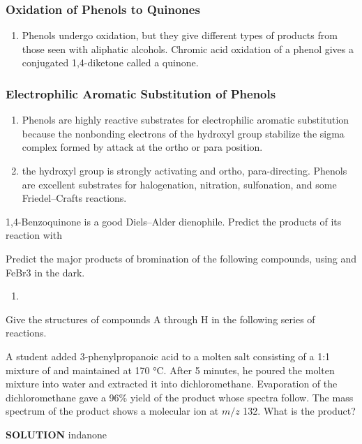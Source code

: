 \subsubsection{Oxidation of Phenols to Quinones}

\begin{enumerate}
    \item Phenols undergo oxidation, but they give different types of products from those seen with aliphatic alcohols. Chromic acid oxidation of a phenol gives a conjugated 1,4-diketone called a quinone.
\end{enumerate}

\subsubsection{Electrophilic Aromatic Substitution of Phenols}

\begin{enumerate}
    \item Phenols are highly reactive substrates for electrophilic aromatic substitution because the nonbonding electrons of the hydroxyl group stabilize the sigma complex formed by attack at the ortho or para position.
    \item the hydroxyl group is strongly activating and ortho, para-directing. Phenols are excellent substrates for halogenation, nitration, sulfonation, and some Friedel–Crafts reactions.
\end{enumerate}

\begin{example} %
    1,4-Benzoquinone is a good Diels–Alder dienophile. Predict the products of its reaction with
\end{example}


\begin{example} %
    Predict the major products of bromination of the following compounds, using and FeBr3 in the dark.
    \begin{enumerate}[label=(\alph*)]
        \item 
    \end{enumerate}
\end{example}

\begin{example} %
    Give the structures of compounds A through H in the following series of reactions.
\end{example}

\begin{example}
    A student added 3-phenylpropanoic acid to a molten salt consisting of a 1:1 mixture of  and  maintained at 170 °C. After 5 minutes, he poured the molten mixture into water and extracted it into dichloromethane. Evaporation of the dichloromethane gave a 96\% yield of the product whose spectra follow. The mass spectrum of the product shows a molecular ion at $ m/z $ 132. What is the product?

    \noindent \textbf{SOLUTION} \quad indanone %
\end{example}

